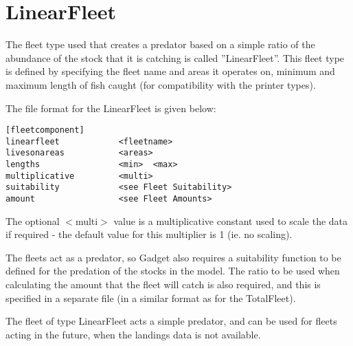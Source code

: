 \documentclass [a4paper, 10pt]{book}
\begin{document}
\section{LinearFleet}\label{sec:linearfleet}
The fleet type used that creates a predator based on a simple ratio of the abundance of the stock that it is catching is called ''LinearFleet''.  This fleet type is defined by specifying the fleet name and areas it operates on, minimum and maximum length of fish caught (for compatibility with the printer types).

\bigskip
The file format for the LinearFleet is given below:

{\small\begin{verbatim}
[fleetcomponent]
linearfleet            <fleetname>
livesonareas           <areas>
lengths                <min>  <max>
multiplicative         <multi>
suitability            <see Fleet Suitability>
amount                 <see Fleet Amounts>
\end{verbatim}}

The optional $<$multi$>$ value is a multiplicative constant used to scale the data if required - the default value for this multiplier is 1 (ie. no scaling).

\bigskip
The fleets act as a predator, so Gadget also requires a suitability function to be defined for the predation of the stocks in the model.  The ratio to be used when calculating the amount that the fleet will catch is also required, and this is specified in a separate file (in a similar format as for the TotalFleet).

\bigskip
The fleet of type LinearFleet acts a simple predator, and can be used for fleets acting in the future, when the landings data is not available.


\end{document}
